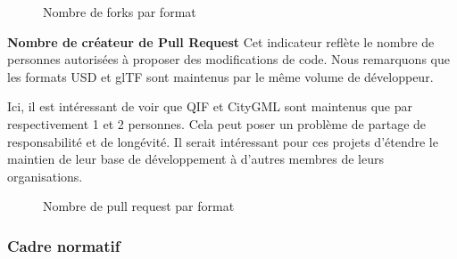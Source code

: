 \documentclass[a4paper,12pt]{article}
\begin{document}
\begin{latex}
\begin{figure}[!h]
    \centering
    \caption{Nombre de forks par format}
    \label{fig:mon_graphique}
\end{figure}
\end{latex}

\textbf{Nombre de créateur de Pull Request}
Cet indicateur reflète le nombre de personnes autorisées à proposer des modifications de code.
Nous remarquons que les formats USD et glTF sont maintenus par le même volume de développeur.

Ici, il est intéressant de voir que QIF et CityGML sont maintenus que par respectivement 1 et 2 personnes. Cela peut poser un problème de partage de responsabilité et de longévité. Il serait intéressant pour ces projets d'étendre le maintien de leur base de développement à d'autres membres de leurs organisations.

\begin{latex}
\begin{figure}[!h]
    \centering
    \caption{Nombre de pull request par format}
    \label{fig:mon_graphique}
\end{figure}
\end{latex}
\subsubsection*{Cadre normatif}
\label{sec:org47c93af}
\end{document}
